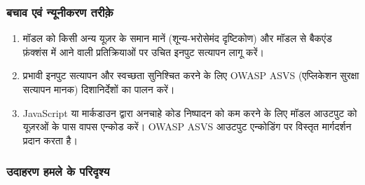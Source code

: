 \documentclass[
]{article}
\providecommand{\tightlist}{%
  \setlength{\itemsep}{0pt}\setlength{\parskip}{0pt}}
\begin{document}
\subsubsection{बचाव एवं न्यूनीकरण
तरीक़े}\label{ux92cux91aux935-ux90fux935-ux928ux92fux928ux915ux930ux923-ux924ux930ux958}

\begin{enumerate}
\def\labelenumi{\arabic{enumi}.}
\tightlist
\item
  मॉडल को किसी अन्य यूज़र के समान मानें (शून्य-भरोसेमंद दृष्टिकोण) और मॉडल से बैकएंड
  फ़ंक्शंस में आने वाली प्रतिक्रियाओं पर उचित इनपुट सत्यापन लागू करें।
\item
  प्रभावी इनपुट सत्यापन और स्वच्छता सुनिश्चित करने के लिए OWASP ASVS (एप्लिकेशन
  सुरक्षा सत्यापन मानक) दिशानिर्देशों का पालन करें।
\item
  JavaScript या मार्कडाउन द्वारा अनचाहे कोड निष्पादन को कम करने के लिए मॉडल
  आउटपुट को यूज़रओं के पास वापस एन्कोड करें। OWASP ASVS आउटपुट एन्कोडिंग पर विस्तृत
  मार्गदर्शन प्रदान करता है।
\end{enumerate}

\subsubsection{उदाहरण हमले के
परिदृश्य}\label{ux909ux926ux939ux930ux923-ux939ux92eux932-ux915-ux92aux930ux926ux936ux92f}
\end{document}
